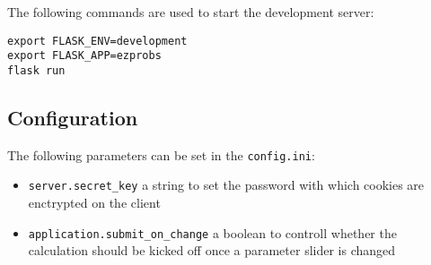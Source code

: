 The following commands are used to start the development server:

\begin{verbatim}
export FLASK_ENV=development
export FLASK_APP=ezprobs
flask run
\end{verbatim}

\subsection{Configuration}

The following parameters can be set in the \verb+config.ini+:

\begin{itemize}
  \item \verb+server.secret_key+ a string to set the password with which
    cookies are enctrypted on the client
  \item \verb+application.submit_on_change+ a boolean to controll whether the
    calculation should be kicked off once a parameter slider is changed
\end{itemize}

